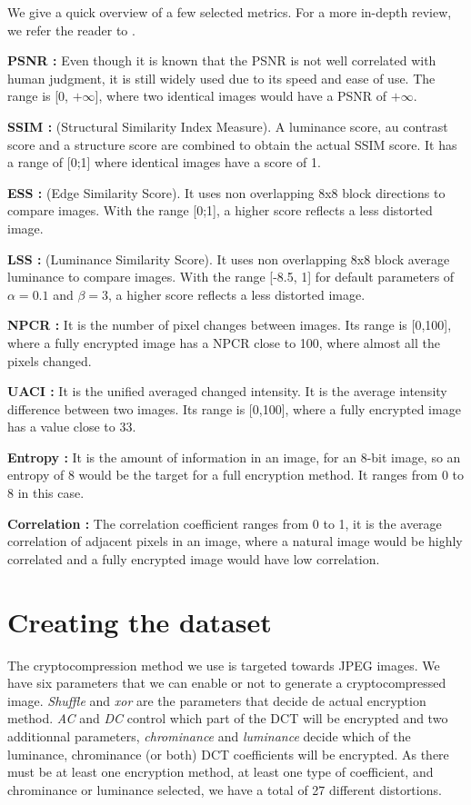 \documentclass{article}
\begin{document}
We give a quick overview of a few selected metrics. For a more in-depth review, we refer the reader to \cite{metrics_deficits}.

\textbf{PSNR :} Even though it is known that the PSNR is not well correlated with human judgment, it is still widely used due to its speed and ease of use. The range is [0, $+\infty$], where two identical images would have a PSNR of $+\infty$.

\textbf{SSIM :} \cite{ssim}(Structural Similarity Index Measure). A luminance score, au contrast score and a structure score are combined to obtain the actual SSIM score. It has a range of [0;1] where identical images have a score of 1.

\textbf{ESS :} \cite{ess_lss}(Edge Similarity Score). It uses non overlapping 8x8 block directions to compare images. With the range [0;1], a higher score reflects a less distorted image.

\textbf{LSS :} \cite{ess_lss}(Luminance Similarity Score). It uses non overlapping 8x8 block average luminance to compare images. With the range [-8.5, 1] for default parameters of $\alpha=0.1$ and $\beta=3$, a higher score reflects a less distorted image.

\textbf{NPCR :} \cite{npcr_uaci}It is the number of pixel changes between images. Its range is [0,100], where a fully encrypted image has a NPCR close to 100, where almost all the pixels changed.

\textbf{UACI :} \cite{npcr_uaci}It is the unified averaged changed intensity. It is the average intensity difference between two images. Its range is [0,100], where a fully encrypted image has a value close to 33.

\textbf{Entropy :} It is the amount of information in an image, for an 8-bit image, so an entropy of 8 would be the target for a full encryption method. It ranges from 0 to 8 in this case.

\textbf{Correlation :} The correlation coefficient ranges from 0 to 1, it is the average correlation of adjacent pixels in an image, where a natural image would be highly correlated and a fully encrypted image would have low correlation.

\section{Creating the dataset}
\label{sec:dataset}
The cryptocompression method we use is targeted towards JPEG images. We have six parameters that we can enable or not to generate a cryptocompressed image. \textit{Shuffle} and \textit{xor} are the parameters that decide de actual encryption method. \textit{AC} and \textit{DC} control which part of the DCT will be encrypted and two additionnal parameters, \textit{chrominance} and \textit{luminance} decide which of the luminance, chrominance (or both) DCT coefficients will be encrypted. As there must be at least one encryption method, at least one type of coefficient, and chrominance or luminance selected, we have a total of 27 different distortions.
\end{document}

